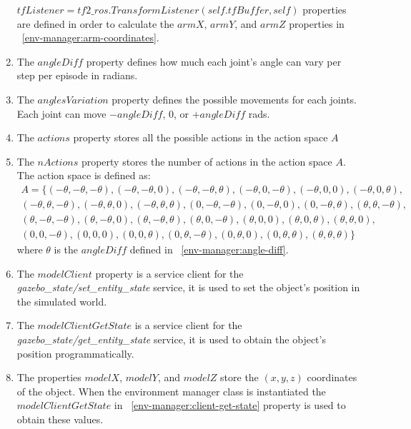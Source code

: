 \documentclass[12pt,oneside]{article}
\begin{document}
\begin{enumerate}
$tfListener = tf2\_ros.TransformListener(self.tfBuffer, self)$ properties are defined in order to calculate the $armX$, $armY$, and $armZ$ properties in ~\ref{env-manager:arm-coordinates}.
\item\label{env-manager:angle-diff} The $angleDiff$ property defines how much each joint's angle can vary per step per episode in radians.
\item The $anglesVariation$ property defines the possible movements for each joints. Each joint can move $-angleDiff$, $0$, or $+angleDiff$ rads.
\item The $actions$ property stores all the possible actions in the action space $A$
\item The $nActions$ property stores the number of actions in the action space $A$. The action space is defined as:
\begin{equation}
  \begin{aligned}
A = \{(-\theta, -\theta, -\theta), (-\theta, -\theta, 0), (-\theta, -\theta, \theta), (-\theta, 0, -\theta), (-\theta, 0, 0), (-\theta, 0, \theta),\\
 (-\theta, \theta, -\theta), (-\theta, \theta, 0), (-\theta, \theta, \theta), (0, -\theta, -\theta), (0, -\theta, 0), (0, -\theta, \theta),(\theta, \theta, -\theta),\\
 (\theta, -\theta, -\theta), (\theta, -\theta, 0), (\theta, -\theta, \theta), (\theta, 0, -\theta), (\theta, 0, 0), (\theta, 0, \theta),(\theta, \theta, 0),\\
 (0, 0, -\theta), (0, 0, 0), (0, 0, \theta), (0, \theta, -\theta), (0, \theta, 0), (0, \theta, \theta), (\theta, \theta, \theta)\} \label{eq:action-space}
  \end{aligned}
\end{equation}
where $\theta$ is the $angleDiff$ defined in ~\ref{env-manager:angle-diff}.
\item\label{env-manager:model-client} The $modelClient$ property is a service client for the \textit{gazebo\_state/set\_entity\_state} service, it is used to set the object's position in the simulated world. 
\item\label{env-manager:client-get-state} The $modelClientGetState$ is a service client for the \textit{gazebo\_state/get\_entity\_state} service, it is used to obtain the object's position programmatically.
\item The properties $modelX$, $modelY$, and $modelZ$ store the $(x, y, z)$ coordinates of the object. When the environment manager class is instantiated the $modelClientGetState$ in ~\ref{env-manager:client-get-state} property is used to obtain these values.

\end{enumerate}
\end{document}
